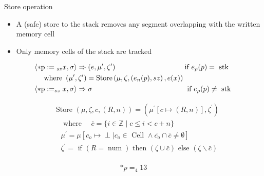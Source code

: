 \documentclass[aspectratio=169]{beamer}
\begin{document}
\begin{frame}{Store operation}
  \begin{itemize}
    \item A (safe) store to the stack removes any segment overlapping with the written memory cell
    \item Only memory cells of the stack are tracked
  \end{itemize}
  \begin{align*}
     & \left\langle * \mathrm{p}:={ }_{s z} x, \sigma\right\rangle \Rightarrow\left(e, \mu^{\prime}, \zeta^{\prime}\right) \quad \hspace{3cm} \text{if } e_\rho(p)=\text{ stk } \\
     & \hspace{0.4cm} \text{ where }\left(\mu^{\prime}, \zeta^{\prime}\right)=\operatorname{Store}\left(\mu, \zeta,\left(e_n(p), s z\right), e(x)\right)                        \\
     & \left\langle * \mathrm{p}:=_{s z} x, \sigma\right\rangle \Rightarrow \sigma \quad \hspace{4.3cm} \text{if } e_\rho(p) \neq \text{ stk }                                  \\
  \end{align*}

  \begin{minipage}{0.1\textwidth}

    \begin{align*}
       & \text { Store }(\mu, \zeta, c,(R, n))=\left(\mu^{\prime}[c \mapsto(R, n)], \zeta^{\prime}\right)                                    \\
       & \quad \text { where } \quad \overline{c}=\{i \in \mathbb{Z} \mid c \leq i<c+n\}                                                     \\
       & \quad \mu^{\prime}=\mu\left[c_o \mapsto \perp \mid c_o \in \text { Cell } \wedge \overline{c_o} \cap \bar{c} \neq \emptyset\right]  \\
       & \quad \zeta^{\prime}=\text { if }(R=\operatorname{num}) \text { then }(\zeta \cup \bar{c}) \text { else }(\zeta \backslash \bar{c}) \\
    \end{align*}

  \end{minipage}
  \begin{minipage}{0.12\textwidth}
    $$*p=_4 13$$


\end{minipage}
\end{frame}
\end{document}
